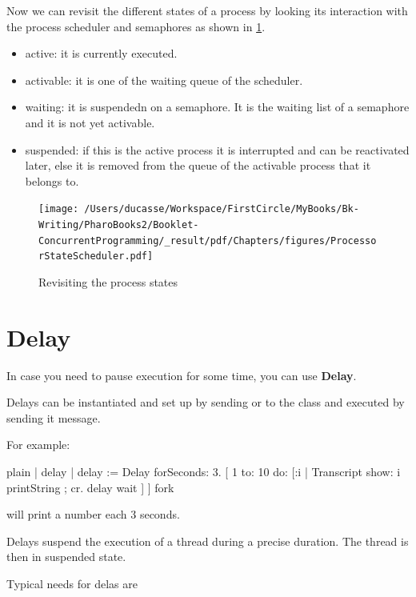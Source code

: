 \documentclass[10pt,twoside,english]{_support/latex/sbabook/sbabook}
\begin{document}
Now we can revisit the different states of a process by looking its interaction with the process scheduler and 
semaphores as shown in \ref{ProcessorStateScheduler}.

\begin{itemize}
\item active: it is currently executed.
\item activable: it is one of the waiting queue of the scheduler.
\item waiting: it is suspendedn on a semaphore. It is the waiting list of a semaphore and it is not yet activable.
\item suspended: if this is the active process it is interrupted and can be reactivated later, else it is removed from the queue of the activable process that it belongs to. 
\end{itemize}


\begin{figure}

\begin{center}
\texttt{[image: /Users/ducasse/Workspace/FirstCircle/MyBooks/Bk-Writing/PharoBooks2/Booklet-ConcurrentProgramming/\_result/pdf/Chapters/figures/ProcessorStateScheduler.pdf]}\caption{Revisiting the process states\label{ProcessorStateScheduler}}\end{center}
\end{figure}

\section{Delay}
In case you need to pause execution for some time, you can use \textbf{Delay}.

Delays can be instantiated and set up by sending  or  to the class  and executed by sending it  message.

For example:

\begin{displaycode}{plain}
| delay |
delay := Delay forSeconds: 3.
[ 1 to: 10 do: [:i |
  Transcript show: i printString ; cr.
  delay wait ] ] fork
\end{displaycode}

will print a number each 3 seconds.

Delays suspend the execution of a thread during a precise duration. The thread is then in suspended state.

Typical needs for delas are 
\end{document}
